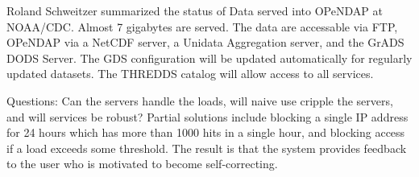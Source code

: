 Roland Schweitzer summarized the status of Data served into OPeNDAP
at NOAA/CDC.  Almost 7 gigabytes are served.  The data are accessable
via FTP, OPeNDAP via a NetCDF server, a Unidata Aggregation server,
and the GrADS DODS Server. The GDS configuration will be updated
automatically for regularly updated datasets.  The THREDDS catalog 
will allow access to all services.  

Questions:  Can the servers
handle the loads, will naive use cripple the servers, and will
services be robust?  Partial solutions include blocking a single
IP address for 24 hours which has more than 1000 hits in a single
hour, and blocking access if a load exceeds some threshold.  The
result is that the system provides feedback to the user who is
motivated to become self-correcting.

%
%
%
%

